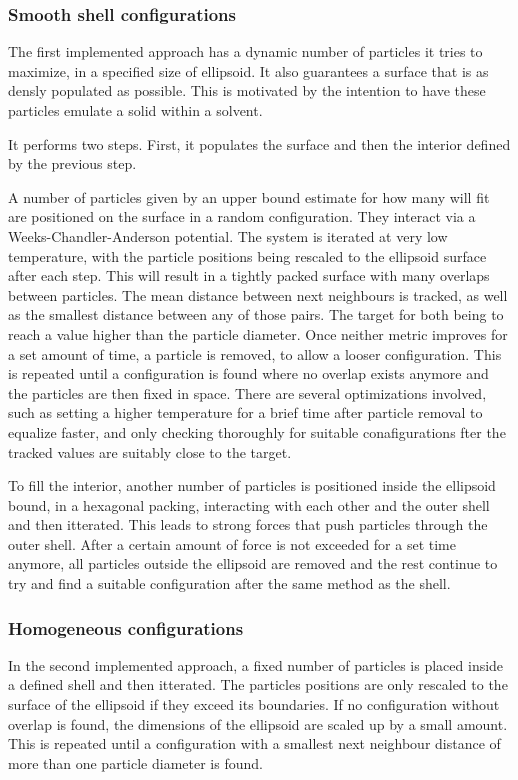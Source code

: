 \documentclass[12pt, DIV=12]{scrartcl}
\begin{document}
\subsubsection{Smooth shell configurations}
The first implemented approach has a dynamic number of particles it tries to maximize, in a specified size of ellipsoid. It also guarantees a surface that is as densly populated as possible. This is motivated by the intention to have these particles emulate a solid within a solvent.

It performs two steps. First, it populates the surface and then the interior defined by the previous step.

A number of particles given by an upper bound estimate for how many will fit are positioned on the surface in a random configuration. They interact via a Weeks-Chandler-Anderson potential. The system is iterated at very low temperature, with the particle positions being rescaled to the ellipsoid surface after each step.
This will result in a tightly packed surface with many overlaps between particles. The mean distance between next neighbours is tracked, as well as the smallest distance between any of those pairs. The target for both being to reach a value higher than the particle diameter. Once neither metric improves for a set amount of time, a particle is removed, to allow a looser configuration. This is repeated until a configuration is found where no overlap exists anymore and the particles are then fixed in space.
There are several optimizations involved, such as setting a higher temperature for a brief time after particle removal to equalize faster, and only checking thoroughly for suitable conafigurations fter the tracked values are suitably close to the target.

To fill the interior, another number of particles is positioned inside the ellipsoid bound, in a hexagonal packing, interacting with each other and the outer shell and then itterated. This leads to strong forces that push particles through the outer shell. After a certain amount of force is not exceeded for a set time anymore, all particles outside the ellipsoid are removed and the rest continue to try and find a suitable configuration after the same method as the shell.


\subsubsection{Homogeneous configurations}
In the second implemented approach, a fixed number of particles is placed inside a defined shell and then itterated. The particles positions are only rescaled to the surface of the ellipsoid if they exceed its boundaries. If no configuration without overlap is found, the dimensions of the ellipsoid are scaled up by a small amount. This is repeated until a configuration with a smallest next neighbour distance of more than one particle diameter is found.
\end{document}
